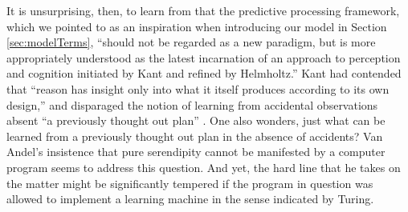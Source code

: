 

 


It is unsurprising, then, to learn from \citet{swanson2016predictive}
that the predictive processing framework, which we pointed to as an
inspiration when introducing our model in Section
\ref{sec:modelTerms}, ``should not be regarded as a new paradigm, but
is more appropriately understood as the latest incarnation of an
approach to perception and cognition initiated by Kant and refined by
Helmholtz.''
Kant had contended that ``reason has insight only 
into what it itself produces according to its own design,''
and disparaged the notion of
learning from accidental observations absent ``a previously thought out
plan'' \cite[p.~20]{kant1929critique}.  One also wonders, just what can be learned from a previously
thought out plan in the absence of accidents?
Van Andel's insistence that pure serendipity
cannot be manifested by a computer program seems to address this question.
And yet, the hard line that he takes on the matter
might be significantly tempered if the program in
question was allowed to implement a learning machine in the sense indicated by Turing.

